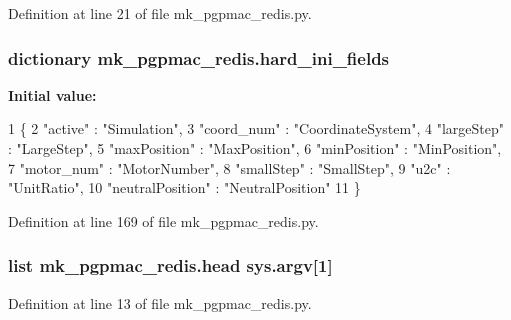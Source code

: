 Definition at line 21 of file mk\-\_\-pgpmac\-\_\-redis.\-py.

\hypertarget{namespacemk__pgpmac__redis_a8257226983aee079ec66f5cc67e194ec}{
\subsubsection[{hard\-\_\-ini\-\_\-fields}]{\setlength{\rightskip}{0pt plus 5cm}dictionary mk\-\_\-pgpmac\-\_\-redis.\-hard\-\_\-ini\-\_\-fields}}\label{namespacemk__pgpmac__redis_a8257226983aee079ec66f5cc67e194ec}
{\bfseries Initial value\-:}
\begin{DoxyCode}
1 \{
2     \textcolor{stringliteral}{"active"}      : \textcolor{stringliteral}{"Simulation"},
3     \textcolor{stringliteral}{"coord\_num"}   : \textcolor{stringliteral}{"CoordinateSystem"},
4     \textcolor{stringliteral}{"largeStep"}   : \textcolor{stringliteral}{"LargeStep"},
5     \textcolor{stringliteral}{"maxPosition"} : \textcolor{stringliteral}{"MaxPosition"},
6     \textcolor{stringliteral}{"minPosition"} : \textcolor{stringliteral}{"MinPosition"},
7     \textcolor{stringliteral}{"motor\_num"}   : \textcolor{stringliteral}{"MotorNumber"},
8     \textcolor{stringliteral}{"smallStep"}   : \textcolor{stringliteral}{"SmallStep"},
9     \textcolor{stringliteral}{"u2c"}         : \textcolor{stringliteral}{"UnitRatio"},
10     \textcolor{stringliteral}{"neutralPosition"} : \textcolor{stringliteral}{"NeutralPosition"}
11     \}
\end{DoxyCode}


Definition at line 169 of file mk\-\_\-pgpmac\-\_\-redis.\-py.

\hypertarget{namespacemk__pgpmac__redis_a760ff4955cbf5beef4ae36a28c30b01a}{
\subsubsection[{head}]{\setlength{\rightskip}{0pt plus 5cm}list mk\-\_\-pgpmac\-\_\-redis.\-head sys.\-argv\mbox{[}1\mbox{]}}}\label{namespacemk__pgpmac__redis_a760ff4955cbf5beef4ae36a28c30b01a}


Definition at line 13 of file mk\-\_\-pgpmac\-\_\-redis.\-py.

